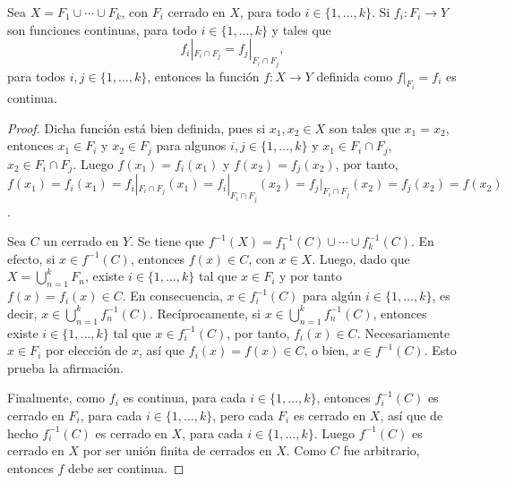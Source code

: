 
\begin{theorem}
Sea $X = F_1 \cup \cdots \cup F_k$, con $F_i$ cerrado en $X$, para todo $i \in \{ 1,\ldots,k \}$. Si $f_i : F_i \longrightarrow Y$ son funciones continuas, para todo $i \in \{ 1,\ldots,k \}$ y tales que
\begin{equation*}
    f_i|_{F_i \cap F_j} = f_j|_{F_i \cap F_j},
\end{equation*}
para todos $i,j \in \{ 1,\ldots,k \}$, entonces la función $f : X \longrightarrow Y$ definida como $f|_{F_i} = f_i$ es continua.
\end{theorem}

\begin{proof}
Dicha función está bien definida, pues si $x_1, x_2 \in X$ son tales que $x_1 = x_2$, entonces $x_1 \in F_i$ y $x_2 \in F_j$ para algunos $i,j \in \{ 1,\ldots,k \}$ y $x_1 \in F_i \cap F_j$, $x_2 \in F_i \cap F_j$. Luego $f(x_1) = f_i(x_1)$ y $f(x_2) = f_j(x_2)$, por tanto, $f(x_1) = f_i(x_1) = f_i|_{F_i \cap F_j}(x_1) = f_i|_{F_i \cap F_j}(x_2) = f_j|_{F_i \cap F_j} (x_2) = f_j(x_2) = f(x_2)$.
\bigskip

Sea $C$ un cerrado en $Y$. Se tiene que $f^{-1}(X) = f_1^{-1}(C) \cup \cdots \cup f_k^{-1}(C)$. En efecto, si $x \in f^{-1}(C)$, entonces $f(x) \in C$, con $x \in X$. Luego, dado que $X = \bigcup_{n=1}^{k} F_n$, existe $i \in \{ 1,\ldots,k \}$ tal que $x \in F_i$ y por tanto $f(x) = f_i(x) \in C$. En consecuencia, $x \in f^{-1}_i (C)$ para algún $i \in \{ 1,\ldots,k \}$, es decir, $x \in \bigcup_{n=1}^{k} f^{-1}_n(C)$. Recíprocamente, si $x \in \bigcup_{n=1}^{k} f^{-1}_n(C)$, entonces existe $i \in \{ 1,\ldots,k \}$ tal que $x \in f^{-1}_i(C)$, por tanto, $f_i(x) \in C$. Necesariamente $x \in F_i$ por elección de $x$, así que $f_i(x) = f(x) \in C$, o bien, $x \in f^{-1}(C)$. Esto prueba la afirmación.
\bigskip

Finalmente, como $f_i$ es continua, para cada $i \in \{ 1,\ldots,k \}$, entonces $f^{-1}_i(C)$ es cerrado en $F_i$, para cada $i \in \{ 1,\ldots,k \}$, pero cada $F_i$ es cerrado en $X$, así que de hecho $f^{-1}_i(C)$ es cerrado en $X$, para cada $i \in \{ 1,\ldots,k \}$. Luego $f^{-1}(C)$ es cerrado en $X$ por ser unión finita de cerrados en $X$. Como $C$ fue arbitrario, entonces $f$ debe ser continua.
\end{proof}
